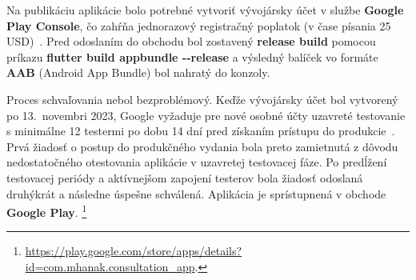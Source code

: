 Na publikáciu aplikácie bolo potrebné vytvoriť vývojársky účet v službe \textbf{Google Play Console}, čo zahŕňa jednorazový registračný poplatok (v čase písania 25 USD)~\cite{google_play_fee}. Pred odoslaním do obchodu bol zostavený \textbf{release build} pomocou príkazu \textbf{flutter build appbundle -{}-release} a výsledný balíček vo formáte \textbf{AAB} (Android App Bundle) bol nahratý do konzoly.

Proces schvaľovania nebol bezproblémový. Keďže vývojársky účet 
bol vytvorený po 13.~novembri 2023, Google vyžaduje pre nové 
osobné účty uzavreté testovanie s minimálne 12 testermi po dobu 
14 dní pred získaním prístupu do produkcie~\cite{google_play_testing_requirements}. 
Prvá žiadosť o postup do produkčného vydania bola preto zamietnutá 
z dôvodu nedostatočného otestovania aplikácie v uzavretej testovacej 
fáze. Po predĺžení testovacej periódy a aktívnejšom zapojení 
testerov bola žiadosť odoslaná druhýkrát a následne úspešne 
schválená. Aplikácia je sprístupnená v obchode \textbf{Google Play}.%
\footnote{\url{https://play.google.com/store/apps/details?id=com.mhanak.consultation_app}.}
